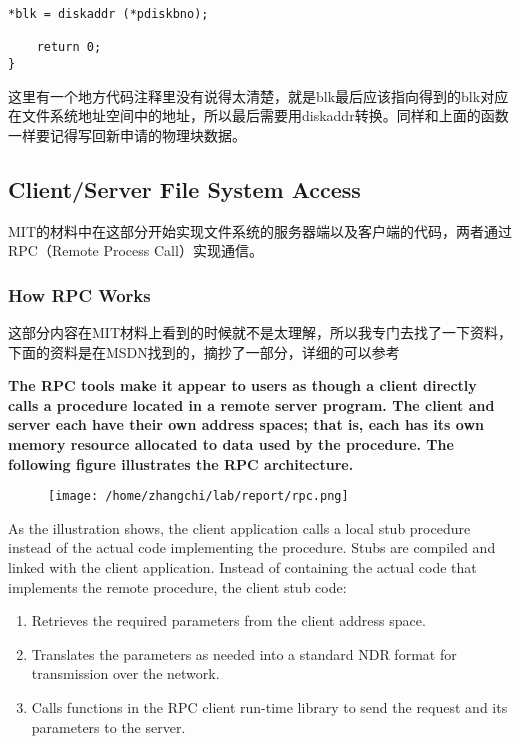 \documentclass{article}
\begin{document}
\begin{CJK*}{UTF8}{gkai}
\begin{lstlisting}[style=ccode, title={\scriptsize \ttfamily \bfseries fs/fs.c: file\_get\_block()}]
    *blk = diskaddr (*pdiskbno);

    return 0;
}
\end{lstlisting}

这里有一个地方代码注释里没有说得太清楚，就是blk最后应该指向得到的blk对应在文件系统地址空间中的地址，所以最后需要用diskaddr转换。同样和上面的函数一样要记得写回新申请的物理块数据。


\subsection{Client/Server File System Access}

MIT的材料中在这部分开始实现文件系统的服务器端以及客户端的代码，两者通过RPC（Remote Process Call）实现通信。

\subsubsection{How RPC Works}

这部分内容在MIT材料上看到的时候就不是太理解，所以我专门去找了一下资料，下面的资料是在MSDN找到的，摘抄了一部分，详细的可以参考

\vspace{2em}

{\sffamily \scriptsize \bfseries The RPC tools make it appear to users as though a client directly calls a procedure located in a remote server program. The client and server each have their own address spaces; that is, each has its own memory resource allocated to data used by the procedure. The following figure illustrates the RPC architecture.

\begin{figure}[htp]
\centering
\texttt{[image: /home/zhangchi/lab/report/rpc.png]}
\end{figure}

As the illustration shows, the client application calls a local stub procedure instead of the actual code implementing the procedure. Stubs are compiled and linked with the client application. Instead of containing the actual code that implements the remote procedure, the client stub code:}

{\sffamily \scriptsize 
\begin{enumerate}
\item{Retrieves the required parameters from the client address space.}
\item{Translates the parameters as needed into a standard NDR format for transmission over the network.}
\item{Calls functions in the RPC client run-time library to send the request and its parameters to the server.}
\end{enumerate}
}



\end{CJK*}
\end{document}
